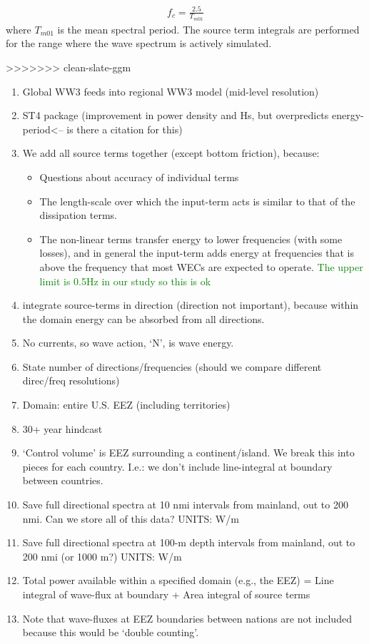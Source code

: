 \begin{align}
  f_{c} = \frac{2.5}{T_{m01}}
\end{align}
where $T_{m01}$ is the mean spectral period. The source term integrals are performed for the range where the wave spectrum is actively simulated.

>>>>>>> clean-slate-ggm

\begin{enumerate}
\item Global WW3 feeds into regional WW3 model (mid-level resolution)
\item ST4 package (improvement in power density and Hs, but overpredicts energy-period<-- is there a citation for this)
\item We add all source terms together (except bottom friction), because:
  \begin{itemize}
  \item Questions about accuracy of individual terms \citep{garcia-medinaWaveResourceAssessment2014}
  \item The length-scale over which the input-term acts is similar to that of the dissipation terms.
  \item The non-linear terms transfer energy to lower frequencies (with some losses), and in general the input-term adds energy at frequencies that is above the frequency that most WECs are expected to operate.  \textcolor{green}{The upper limit is 0.5Hz in our study so this is ok}
  \end{itemize}
\item integrate source-terms in direction (direction not important), because within the domain energy can be absorbed from all directions.
\item No currents, so wave action, ‘N’, is wave energy.
\item State number of directions/frequencies (should we compare different direc/freq resolutions)
\item Domain: entire U.S. EEZ (including territories)
\item 30+ year hindcast
\item ‘Control volume’ is EEZ surrounding a continent/island. We break this into pieces for each country. I.e.: we don’t include line-integral at boundary between countries.
\item Save full directional spectra at 10 nmi intervals from mainland, out to 200 nmi. Can we store all of this data? UNITS: W/m
\item Save full directional spectra at 100-m depth intervals from mainland, out to 200 nmi (or 1000 m?) UNITS: W/m
\item Total power available within a specified domain (e.g., the EEZ) = Line integral of wave-flux at boundary + Area integral of source terms
\item Note that wave-fluxes at EEZ boundaries between nations are not included because this would be ‘double counting’.
\end{enumerate}

